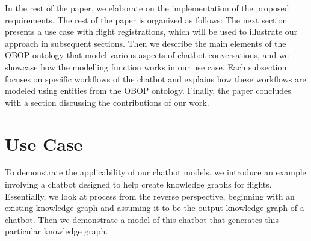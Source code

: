 \documentclass[runningheads]{llncs}
\begin{document}

In the rest of the paper, we elaborate on the implementation of the proposed requirements. The rest of the paper is organized as follows: The next section presents a use case with flight registrations, which will be used to illustrate our approach in subsequent sections. Then we describe the main elements of the OBOP ontology that model various aspects of chatbot conversations, and we showcase how the modelling function works in our use case. Each subsection focuses on specific workflows of the chatbot and explains how these workflows are modeled using entities from the OBOP ontology. Finally, the paper concludes with a section discussing the contributions of our work.
\section{Use Case}
To demonstrate the applicability of our chatbot models, we introduce an example involving a chatbot designed to help create knowledge graphs for flights. Essentially, we look at process from the reverse perspective, beginning with an existing knowledge graph and assuming it to be the output knowledge graph of a chatbot. Then we demonstrate a model of this chatbot that generates this particular knowledge graph. 
\end{document}
